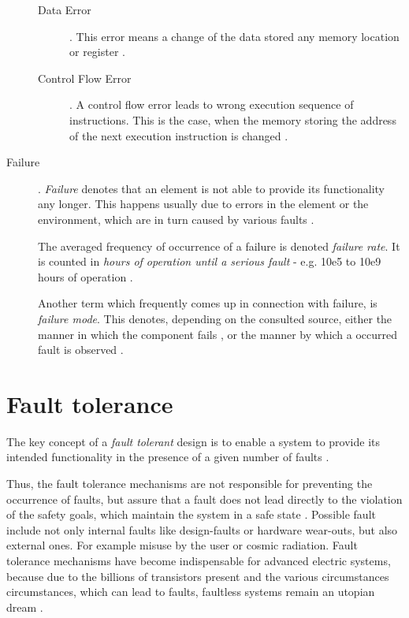 \begin{description}
	\begin{description}
	\item [Data Error] .
	This error means a change of the data stored any memory location or register \cite{elattar2007}.

	\item [Control Flow Error] .
	A control flow error leads to wrong execution sequence of instructions. This is the case, when the memory storing the address of the next execution instruction is changed \cite{elattar2007}.
	\end{description}

\item [Failure] .
\emph{Failure} denotes that an element is not able to provide its functionality any longer. This happens usually due to errors in the element or the environment, which are in turn caused by various faults \cite{iso26262:1} \cite{nelson} \cite{autosar_glossary}.

The averaged frequency of occurrence of a failure is denoted \emph{failure rate}. It is counted in \emph{hours of operation until a serious fault} - e.g. 10e5 to 10e9 hours of operation \cite{rodrigues2011}.

Another term which frequently comes up in connection with failure, is \emph{failure mode}. This denotes, depending on the consulted source, either the manner in which the component fails \cite{international2006analysis}, or the manner by which a occurred fault is observed \cite{mil1980}.
\end{description}




\section{Fault tolerance}
\label{ch:fault_tolerance}

The key concept of a \emph{fault tolerant} design is to enable a system to provide its intended functionality in the presence of a given number of faults \cite{nelson}.

Thus, the fault tolerance mechanisms are not responsible for preventing the occurrence of faults, but assure that a fault does not lead directly to the violation of the safety goals, which maintain the system in a safe state \cite{iso26262:1}. Possible fault include not only internal faults like design-faults or hardware wear-outs, but also external ones. For example misuse by the user or cosmic radiation. Fault tolerance mechanisms have become indispensable for advanced electric systems, because due to the billions of transistors present and the various circumstances circumstances, which can lead to faults, faultless systems remain an utopian dream \cite{genesys}.



